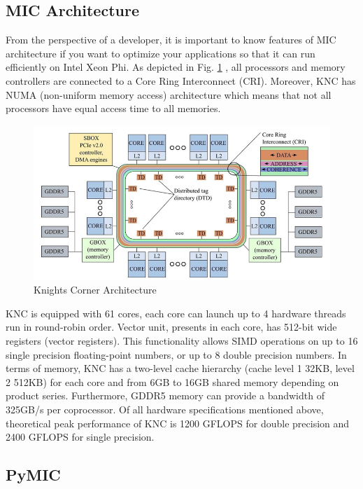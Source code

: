\label{background}
\subsection{MIC Architecture}

From the perspective of a developer, it is important to know features of MIC architecture if you want to optimize your applications so that it can run efficiently on Intel Xeon Phi. As depicted in Fig. \ref{fig:arch} \cite{phibook}, all processors and memory controllers are connected to a Core Ring Interconnect (CRI). Moreover, KNC has NUMA (non-uniform memory access) architecture which means that not all processors have equal access time to all memories.

\begin{figure}[h]
\centering
\includegraphics[scale=0.45]{img/mic-arch.png}
\caption{Knights Corner Architecture}
\label{fig:arch}
\end{figure}

KNC is equipped with 61 cores, each core can launch up to 4 hardware threads run in round-robin order. Vector unit, presents in each core, has 512-bit wide registers (vector registers). This functionality allows SIMD operations on up to 16 single precision floating-point numbers, or up to 8 double precision numbers. In terms of memory, KNC has a two-level cache hierarchy (cache level 1 32KB, level 2 512KB) for each core and from 6GB to 16GB shared memory depending on product series. Furthermore, GDDR5 memory can provide a bandwidth of 325GB/s per coprocessor. Of all hardware specifications mentioned above, theoretical peak performance of KNC is 1200 GFLOPS for double precision and 2400 GFLOPS for single precision.

\subsection{PyMIC}

